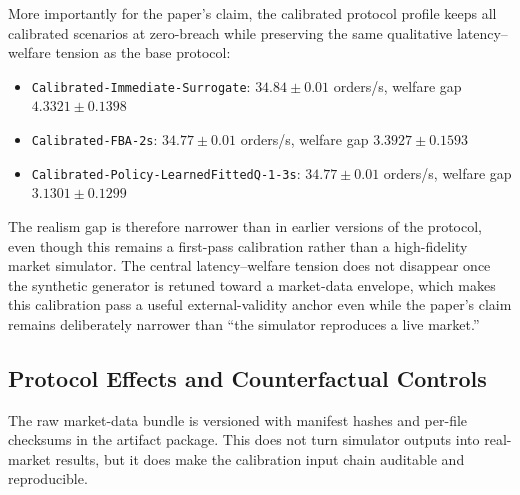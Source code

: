 \documentclass[11pt]{article}
\begin{document}
More importantly for the paper's claim, the calibrated protocol profile keeps all calibrated scenarios at zero-breach while preserving the same qualitative latency--welfare tension as the base protocol:
\begin{itemize}[leftmargin=*]
  \item \texttt{Calibrated-Immediate-Surrogate}: $34.84 \pm 0.01$ orders/s, welfare gap $4.3321 \pm 0.1398$
  \item \texttt{Calibrated-FBA-2s}: $34.77 \pm 0.01$ orders/s, welfare gap $3.3927 \pm 0.1593$
  \item \texttt{Calibrated-Policy-LearnedFittedQ-1-3s}: $34.77 \pm 0.01$ orders/s, welfare gap $3.1301 \pm 0.1299$
\end{itemize}
The realism gap is therefore narrower than in earlier versions of the protocol, even though this remains a first-pass calibration rather than a high-fidelity market simulator. The central latency--welfare tension does not disappear once the synthetic generator is retuned toward a market-data envelope, which makes this calibration pass a useful external-validity anchor even while the paper's claim remains deliberately narrower than ``the simulator reproduces a live market.''

\subsection{Protocol Effects and Counterfactual Controls}
The raw market-data bundle is versioned with manifest hashes and per-file checksums in the artifact package. This does not turn simulator outputs into real-market results, but it does make the calibration input chain auditable and reproducible.
\end{document}
